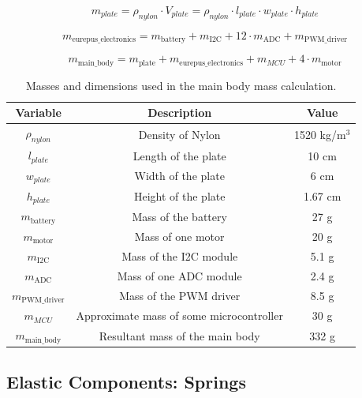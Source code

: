 \begin{equation}
\label{eq:Nylon_plate}
m_{plate} = \rho_{nylon} \cdot V_{plate} = \rho_{nylon} \cdot l_{plate} \cdot w_{plate} \cdot h_{plate}
\end{equation}

\begin{equation}
\label{eq:eurepus_electronics}
m_{\text{eurepus\_electronics}} = m_{\text{battery}} + m_{\text{I2C}} + 12 \cdot m_{\text{ADC}} + m_{\text{PWM\_driver}}
\end{equation}

\begin{equation}
\label{eq:main_body_mass}
m_{\text{main\_body}} = m_{\text{plate}} + m_{\text{eurepus\_electronics}}+m_{MCU}+ 4 \cdot m_{\text{motor}}
\end{equation}

\begin{table}
\centering
\begin{tabular}{|c|c|c|}
\hline
\textbf{Variable} & \textbf{Description} & \textbf{Value} \\
\hline
$\rho_{nylon}$ & Density of Nylon & 1520 kg/m$^3$  \\
$l_{plate}$ & Length of the plate & 10 cm \\
$w_{plate}$ & Width of the plate & 6 cm \\
$h_{plate}$ & Height of the plate & 1.67 cm \\
$m_{\text{battery}}$ & Mass of the battery & 27 g  \\
$m_{\text{motor}}$ & Mass of one motor & 20 g  \\
$m_{\text{I2C}}$ & Mass of the I2C module & 5.1 g  \\
$m_{\text{ADC}}$ & Mass of one ADC module & 2.4 g  \\
$m_{\text{PWM\_driver}}$ & Mass of the PWM driver & 8.5 g  \\
$m_{MCU}$ & Approximate mass of some microcontroller & 30 g \\
$m_{\text{main\_body}}$ & Resultant mass of the main body & 332 g \\
\hline
\end{tabular}
\caption{Masses and dimensions used in the main body mass calculation.}
\label{tab:component_masses}
\end{table}


\subsection{Elastic Components: Springs}

